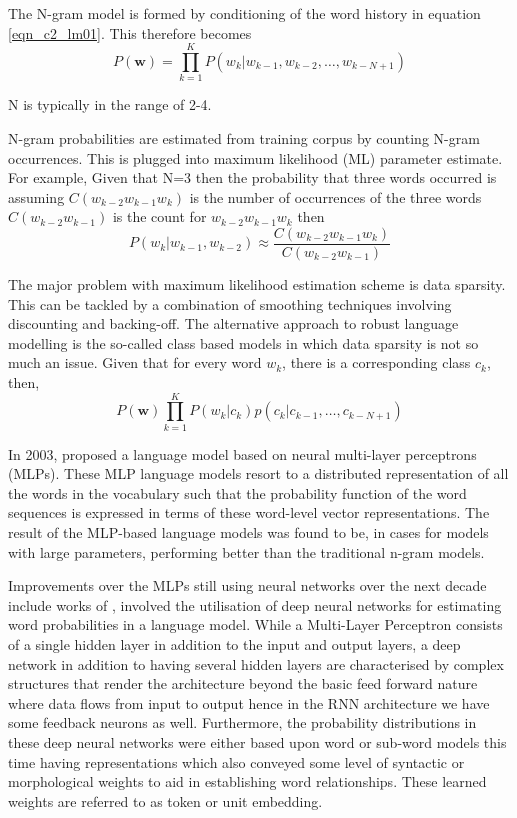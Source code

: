 The N-gram model is formed by conditioning of the word history in equation \ref{eqn_c2_lm01}.  This therefore becomes
\begin{equation}P(\mathbf{w})=\prod_{k=1}^KP(w_k|w_{k-1},w_{k-2},\dots,w_{k-N+1})
\label{eqn_c2_lm02}
\end{equation}

N is typically in the range of 2-4.

N-gram probabilities are estimated from training corpus by counting N-gram occurrences.  This is plugged into maximum likelihood (ML) parameter estimate. For example, Given that N=3 then the probability that three words occurred is assuming $C(w_{k-2}w_{k-1}w_k)$ is the number of occurrences of the three words $C(w_{k-2}w_{k-1})$ is the count for $w_{k-2}w_{k-1}w_k$ then
\begin{equation}
P(w_k|w_{k-1},w_{k-2})\approx\frac{C(w_{k-2}w_{k-1}w_k)}{C(w_{k-2}w_{k-1})}
\label{eqn_c2_lm03}
\end{equation}

The major problem with maximum likelihood estimation scheme is data sparsity. This can be tackled by a combination of smoothing techniques involving discounting and backing-off.  The alternative approach to robust language modelling is the so-called class based models \citep{Brown1992class,Kuhn1990cache} in which data sparsity is not so much an issue.  Given that for every word $w_k$, there is a corresponding class $c_k$, then,
\begin{equation}
P(\mathbf{w})\prod_{k=1}^KP(w_k|c_k)p(c_k|c_{k-1},\dots,c_{k-N+1})
\label{eqn_c2_lm04}
\end{equation}

In 2003,  \cite{bengio2003neural} proposed a language model based on neural multi-layer perceptrons (MLPs). These MLP language models resort to a distributed representation of all the words in the vocabulary such that the probability function of the word sequences is expressed in terms of these word-level vector representations. The result of the MLP-based language models was found to be, in cases for models with large parameters, performing better than the traditional n-gram models.

Improvements over the MLPs still using neural networks over the next decade include works of \cite{mikolov2011empirical,sutskever2014sequence,luong2013better}, involved the utilisation of deep neural networks for estimating word probabilities in a language model.  While a Multi-Layer Perceptron consists of a single hidden layer in addition to the input and output layers, a deep network in addition to having several hidden layers are characterised by complex structures that render the architecture beyond the basic feed forward nature where data flows from input to output hence in the RNN architecture we have some feedback neurons as well.  Furthermore, the probability distributions in these deep neural networks were either based upon word or sub-word models this time having representations which also conveyed some level of syntactic or morphological weights to aid in establishing word relationships.  These learned weights are referred to as token or unit embedding.

